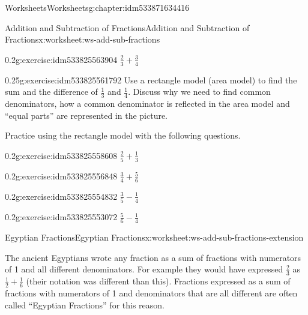 \documentclass[twoside,11pt,]{book}
\begin{document}
\begin{chapterptx}{Worksheets}{}{Worksheets}{}{}{g:chapter:idm533871634416}
\begin{worksheet-section-numberless}{Addition and Subtraction of Fractions}{}{Addition and Subtraction of Fractions}{}{}{x:worksheet:ws-add-sub-fractions}
\begin{divisionexercise}{3}{}{0.2}{g:exercise:idm533825563904}%
\(\frac{2}{3} + \frac{3}{4} \)%
\end{divisionexercise}%
\clearpage
\begin{divisionexercise}{4}{}{0.25}{g:exercise:idm533825561792}%
Use a rectangle model (area model) to find the sum and the difference of \(\frac{1}{3} \) and \(\frac{1}{4} \).  Discuss why we need to find common denominators, how a common denominator is reflected in the area model and “equal parts” are represented in the picture.%
\end{divisionexercise}%
\begin{introduction}{}%
Practice using the rectangle model with the following questions.%
\end{introduction}%
\begin{divisionexercise}{5}{}{0.2}{g:exercise:idm533825558608}%
\(\frac{2}{5} + \frac{1}{3} \)%
\end{divisionexercise}%
\begin{divisionexercise}{6}{}{0.2}{g:exercise:idm533825556848}%
\(\frac{3}{4} + \frac{5}{6} \)%
\end{divisionexercise}%
\clearpage
\begin{divisionexercise}{7}{}{0.2}{g:exercise:idm533825554832}%
\(\frac{3}{5} - \frac{1}{4}  \)%
\end{divisionexercise}%
\begin{divisionexercise}{8}{}{0.2}{g:exercise:idm533825553072}%
\(\frac{5}{6} - \frac{1}{4} \)%
\end{divisionexercise}%
\end{worksheet-section-numberless}
\restoregeometry
%
%
\typeout{************************************************}
\typeout{************************************************}
%
\begin{worksheet-section-numberless}{Egyptian Fractions}{}{Egyptian Fractions}{}{}{x:worksheet:ws-add-sub-fractions-extension}
\begin{introduction}{}%
The ancient Egyptians wrote any fraction as a sum of fractions with numerators of 1 and all different denominators.  For example they would have expressed \(\frac{2}{3} \) as \(\frac{1}{2} + \frac{1}{6} \) (their notation was different than this).  Fractions expressed as a sum of fractions with numerators of 1 and denominators that are all different are often called “Egyptian Fractions” for this reason.%

\end{introduction}
\end{worksheet-section-numberless}
\end{chapterptx}
\end{document}
